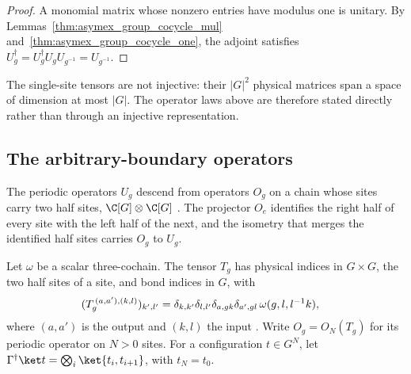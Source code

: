 \begin{proof}
    \leanok
    A monomial matrix whose nonzero entries have modulus one is unitary.
    By Lemmas~\ref{thm:asymex_group_cocycle_mul}
    and~\ref{thm:asymex_group_cocycle_one}, the adjoint satisfies
    $U_g^\dagger=U_g^\dagger U_gU_{g^{-1}}=U_{g^{-1}}$.
\end{proof}

The single-site tensors are not injective: their $|G|^2$ physical matrices
span a space of dimension at most $|G|$. The operator laws above are
therefore stated directly rather than through an injective representation.

\subsection{The arbitrary-boundary operators}

The periodic operators $U_g$ descend from operators $O_g$ on a chain whose
sites carry two half sites, $\C[G]\otimes\C[G]$
\cite{GarreRubio2023MPOSym}. The projector $O_e$ identifies the right half of
every site with the left half of the next, and the isometry that merges the
identified half sites carries $O_g$ to $U_g$.

\begin{definition}
    \label{def:asymex_group_cocycle_boundary_tensor}
    \leanok
    Let $\omega$ be a scalar three-cochain. The tensor $T_g$ has physical
    indices in $G\times G$, the two half sites of a site, and bond indices in
    $G$, with
    \begin{align}
        (T_g^{\,(a,a'),(k,l)})_{k',l'}
         & =\delta_{k,k'}\delta_{l,l'}\delta_{a,gk}\delta_{a',gl}\,
        \omega(g,l,l^{-1}k),
        \notag
    \end{align}
    where $(a,a')$ is the output and $(k,l)$ the input
    \cite{GarreRubio2023MPOSym}. Write $O_g=O_N(T_g)$ for its periodic
    operator on $N>0$ sites. For a configuration $t\in G^N$, let
    $\Gamma^\dagger\ket t=\bigotimes_i\ket{t_i,t_{i+1}}$, with $t_N=t_0$.
\end{definition}

